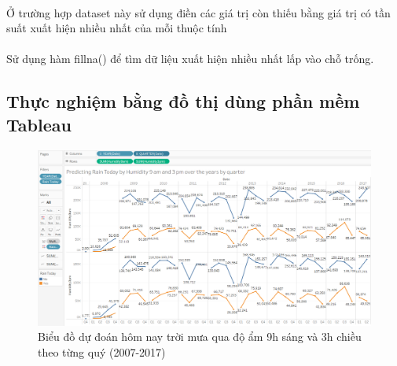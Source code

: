 \documentclass{article}
\begin{document}
\paragraph{}Ở trường hợp dataset này sử dụng điền các giá trị còn thiếu bằng giá trị có tần suất xuất hiện nhiều nhất của mỗi thuộc tính
\paragraph{}Sử dụng hàm fillna() để tìm dữ liệu xuất hiện nhiều nhất lấp vào chỗ trống.
\subsection{Thực nghiệm bằng đồ thị dùng phần mềm Tableau}
\begin{figure}[!h]
	\begin{center}
		\includegraphics[width=\linewidth]{images/tableau1.png}
		\caption{\fontsize{14}{20}\selectfont Biểu đồ dự đoán hôm nay trời mưa qua độ ẩm 9h sáng và 3h chiều theo từng quý (2007-2017)}
	\end{center}
\end{figure}
\paragraph{}\paragraph{}\paragraph{}\paragraph{}
\end{document}
